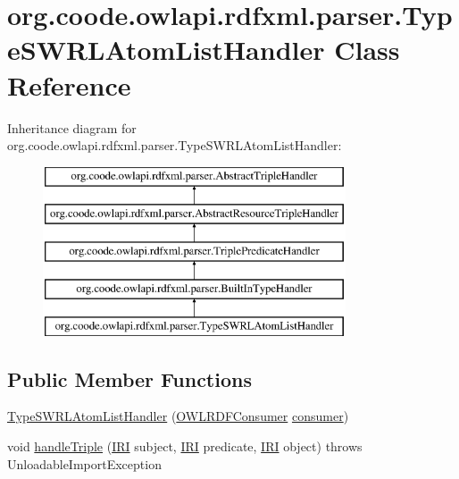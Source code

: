 \hypertarget{classorg_1_1coode_1_1owlapi_1_1rdfxml_1_1parser_1_1_type_s_w_r_l_atom_list_handler}{\section{org.\-coode.\-owlapi.\-rdfxml.\-parser.\-Type\-S\-W\-R\-L\-Atom\-List\-Handler Class Reference}
\label{classorg_1_1coode_1_1owlapi_1_1rdfxml_1_1parser_1_1_type_s_w_r_l_atom_list_handler}
}
Inheritance diagram for org.\-coode.\-owlapi.\-rdfxml.\-parser.\-Type\-S\-W\-R\-L\-Atom\-List\-Handler\-:\begin{figure}[H]
\begin{center}
\leavevmode
\includegraphics[height=5.000000cm]{classorg_1_1coode_1_1owlapi_1_1rdfxml_1_1parser_1_1_type_s_w_r_l_atom_list_handler}
\end{center}
\end{figure}
\subsection*{Public Member Functions}
\begin{DoxyCompactItemize}
\item 
\hyperlink{classorg_1_1coode_1_1owlapi_1_1rdfxml_1_1parser_1_1_type_s_w_r_l_atom_list_handler_abd4fdc8329b607e1c6db995c34fb6817}{Type\-S\-W\-R\-L\-Atom\-List\-Handler} (\hyperlink{classorg_1_1coode_1_1owlapi_1_1rdfxml_1_1parser_1_1_o_w_l_r_d_f_consumer}{O\-W\-L\-R\-D\-F\-Consumer} \hyperlink{classorg_1_1coode_1_1owlapi_1_1rdfxml_1_1parser_1_1_abstract_triple_handler_a4ccf4d898ff01eb1cadfa04b23d54e9c}{consumer})
\item 
void \hyperlink{classorg_1_1coode_1_1owlapi_1_1rdfxml_1_1parser_1_1_type_s_w_r_l_atom_list_handler_a27a66a981df92f257f202df07e68f031}{handle\-Triple} (\hyperlink{classorg_1_1semanticweb_1_1owlapi_1_1model_1_1_i_r_i}{I\-R\-I} subject, \hyperlink{classorg_1_1semanticweb_1_1owlapi_1_1model_1_1_i_r_i}{I\-R\-I} predicate, \hyperlink{classorg_1_1semanticweb_1_1owlapi_1_1model_1_1_i_r_i}{I\-R\-I} object)  throws Unloadable\-Import\-Exception 
\end{DoxyCompactItemize}
